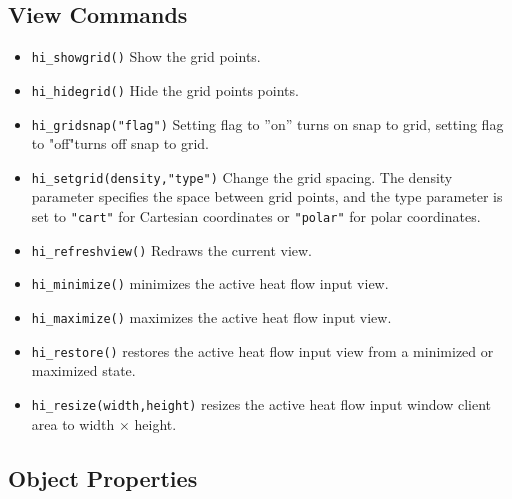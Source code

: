 \subsection{View Commands}
\begin{itemize}
\item \texttt{hi\_showgrid()} Show the grid points.

\item \texttt{hi\_hidegrid()} Hide the grid points points.

\item \texttt{hi\_gridsnap("flag")} Setting flag to ''on'' turns on snap to grid,
setting flag to "off"turns off snap to grid.

\item \texttt{hi\_setgrid(density,"type")} Change the grid spacing. The density
parameter specifies the space between grid points, and the type
parameter is set to \texttt{"cart"} for Cartesian coordinates or
\texttt{"polar"} for polar coordinates.

\item \texttt{hi\_refreshview()} Redraws the current view.

\item{\tt hi\_minimize()} minimizes the active heat flow input view.

\item{\tt hi\_maximize()} maximizes the active heat flow input view.

\item{\tt hi\_restore()} restores the active heat flow input view from a
 minimized or maximized state.

\item{\tt hi\_resize(width,height)} resizes the active heat flow input
 window client area to width $\times$ height.

\end{itemize}


\subsection{Object Properties}

